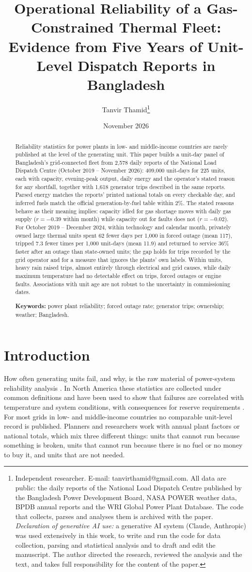 \documentclass[11pt]{article}
\title{\textbf{Operational Reliability of a Gas-Constrained Thermal Fleet:\\ Evidence from Five Years of Unit-Level Dispatch Reports in Bangladesh}}
\author{Tanvir Thamid\thanks{Independent researcher. E-mail: tanvirthamid@gmail.com. All data are public: the daily reports of the National Load Dispatch Centre published by the Bangladesh Power Development Board, NASA POWER weather data, BPDB annual reports and the WRI Global Power Plant Database. The code that collects, parses and analyses them is archived with the paper. \emph{Declaration of generative AI use:} a generative AI system (Claude, Anthropic) was used extensively in this work, to write and run the code for data collection, parsing and statistical analysis and to draft and edit the manuscript. The author directed the research, reviewed the analysis and the text, and takes full responsibility for the content of the paper.}}
\date{November 2026}
\begin{document}
\maketitle
\begin{abstract}
\noindent Reliability statistics for power plants in low- and middle-income countries are rarely published at the level of the generating unit. This paper builds a unit-day panel of Bangladesh's grid-connected fleet from 2,578 daily reports of the National Load Dispatch Centre (October 2019 -- November 2026): 409,000 unit-days for 225 units, each with capacity, evening-peak output, daily energy and the operator's stated reason for any shortfall, together with 1,618 generator trips described in the same reports. Parsed energy matches the reports' printed national totals on every checkable day, and inferred fuels match the official generation-by-fuel table within 2\%. The stated reasons behave as their meaning implies: capacity idled for gas shortage moves with daily gas supply ($r=-0.39$ within month) while capacity out for faults does not ($r=-0.02$). For October 2019 -- December 2024, within technology and calendar month, privately owned large thermal units spent 62 fewer days per 1,000 in forced outage (mean 117), tripped 7.3 fewer times per 1,000 unit-days (mean 11.9) and returned to service 36\% faster after an outage than state-owned units; the gap holds for trips recorded by the grid operator and for a measure that ignores the plants' own labels. Within units, heavy rain raised trips, almost entirely through electrical and grid causes, while daily maximum temperature had no detectable effect on trips, forced outages or engine faults. Associations with unit age are not robust to the uncertainty in commissioning dates.

\medskip
\noindent\textbf{Keywords:} power plant reliability; forced outage rate; generator trips; ownership; weather; Bangladesh.
\end{abstract}

\newpage
\section{Introduction}

How often generating units fail, and why, is the raw material of power-system reliability analysis \citep{billinton1996reliability}. In North America these statistics are collected under common definitions \citep{ieee762} and have been used to show that failures are correlated with temperature and system conditions, with consequences for reserve requirements \citep{murphy2018adequacy,murphy2019timedependent,murphy2020temperature}. For most grids in low- and middle-income countries no comparable unit-level record is published. Planners and researchers work with annual plant factors or national totals, which mix three different things: units that cannot run because something is broken, units that cannot run because there is no fuel or no money to buy it, and units that are not needed.
\end{document}
